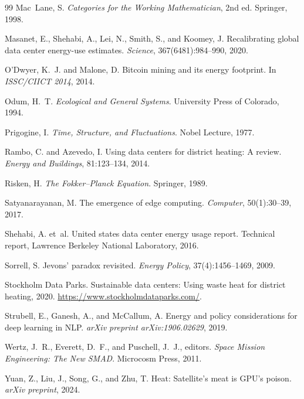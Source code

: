 \documentclass[10pt,twocolumn]{article}
\theoremstyle{plain}
\theoremstyle{definition}
\theoremstyle{remark}
\begin{document}
\begin{thebibliography}{99}
Mac~Lane, S.
\newblock \emph{Categories for the Working Mathematician}, 2nd ed.
\newblock Springer, 1998.

Masanet, E., Shehabi, A., Lei, N., Smith, S., and Koomey, J.
\newblock Recalibrating global data center energy-use estimates.
\newblock \emph{Science}, 367(6481):984--990, 2020.

O'Dwyer, K.~J. and Malone, D.
\newblock Bitcoin mining and its energy footprint.
\newblock In \emph{ISSC/CIICT 2014}, 2014.

Odum, H.~T.
\newblock \emph{Ecological and General Systems}.
\newblock University Press of Colorado, 1994.

Prigogine, I.
\newblock \emph{Time, Structure, and Fluctuations}.
\newblock Nobel Lecture, 1977.

Rambo, C. and Azevedo, I.
\newblock Using data centers for district heating: A review.
\newblock \emph{Energy and Buildings}, 81:123--134, 2014.

Risken, H.
\newblock \emph{The Fokker--Planck Equation}.
\newblock Springer, 1989.

Satyanarayanan, M.
\newblock The emergence of edge computing.
\newblock \emph{Computer}, 50(1):30--39, 2017.

Shehabi, A. et~al.
\newblock United states data center energy usage report.
\newblock Technical report, Lawrence Berkeley National Laboratory, 2016.

Sorrell, S.
\newblock Jevons' paradox revisited.
\newblock \emph{Energy Policy}, 37(4):1456--1469, 2009.

Stockholm Data Parks.
\newblock Sustainable data centers: Using waste heat for district heating, 2020.
\newblock \url{https://www.stockholmdataparks.com/}.

Strubell, E., Ganesh, A., and McCallum, A.
\newblock Energy and policy considerations for deep learning in NLP\@.
\newblock \emph{arXiv preprint arXiv:1906.02629}, 2019.

Wertz, J.~R., Everett, D.~F., and Puschell, J.~J., editors.
\newblock \emph{Space Mission Engineering: The New SMAD}.
\newblock Microcosm Press, 2011.

Yuan, Z., Liu, J., Song, G., and Zhu, T.
\newblock Heat: Satellite's meat is GPU's poison.
\newblock \emph{arXiv preprint}, 2024.

\end{thebibliography}
\end{document}
